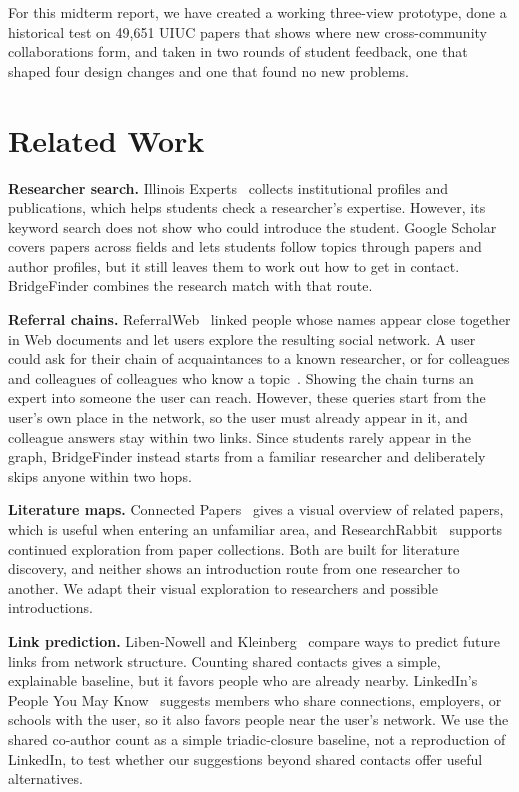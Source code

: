 \documentclass[10pt,twocolumn,letterpaper]{article}
\begin{document}
For this midterm report, we have created a working three-view prototype, done a historical test on 49,651 UIUC papers that shows where new cross-community collaborations form, and taken in two rounds of student feedback, one that shaped four design changes and one that found no new problems.

\section{Related Work}
\textbf{Researcher search.} Illinois Experts~\cite{experts} collects institutional profiles and publications, which helps students check a researcher's expertise. However, its keyword search does not show who could introduce the student. Google Scholar~\cite{scholar} covers papers across fields and lets students follow topics through papers and author profiles, but it still leaves them to work out how to get in contact. BridgeFinder combines the research match with that route.

\textbf{Referral chains.} ReferralWeb~\cite{kautz1997} linked people whose names appear close together in Web documents and let users explore the resulting social network. A user could ask for their chain of acquaintances to a known researcher, or for colleagues and colleagues of colleagues who know a topic~\cite{perugini2003}. Showing the chain turns an expert into someone the user can reach. However, these queries start from the user's own place in the network, so the user must already appear in it, and colleague answers stay within two links. Since students rarely appear in the graph, BridgeFinder instead starts from a familiar researcher and deliberately skips anyone within two hops.

\textbf{Literature maps.} Connected Papers~\cite{connectedpapers} gives a visual overview of related papers, which is useful when entering an unfamiliar area, and ResearchRabbit~\cite{researchrabbit} supports continued exploration from paper collections. Both are built for literature discovery, and neither shows an introduction route from one researcher to another. We adapt their visual exploration to researchers and possible introductions.

\textbf{Link prediction.} Liben-Nowell and Kleinberg~\cite{libennowell2007} compare ways to predict future links from network structure. Counting shared contacts gives a simple, explainable baseline, but it favors people who are already nearby. LinkedIn's People You May Know~\cite{linkedin} suggests members who share connections, employers, or schools with the user, so it also favors people near the user's network. We use the shared co-author count as a simple triadic-closure baseline, not a reproduction of LinkedIn, to test whether our suggestions beyond shared contacts offer useful alternatives.
\end{document}
